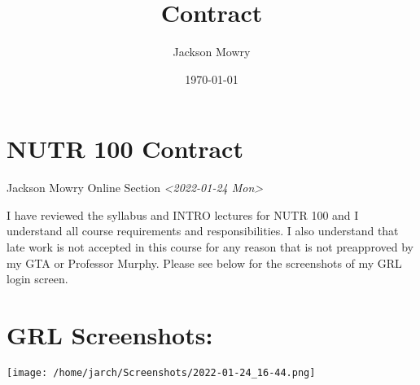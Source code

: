 \documentclass[11pt]{article}
\author{Jackson Mowry}
\date{\today}
\title{Contract}
\begin{document}
\maketitle
\tableofcontents

\section{NUTR 100 Contract}
\label{sec:orgdfe4a4f}
Jackson Mowry
Online Section
\textit{<2022-01-24 Mon>}

I have reviewed the syllabus and INTRO lectures for NUTR 100 and I understand all course 
requirements and responsibilities. I also understand that late work is not accepted in this course 
for any reason that is not preapproved by my GTA or Professor Murphy. Please see below for the 
screenshots of my GRL login screen.

\section{GRL Screenshots:}
\label{sec:orgbcd1010}
\begin{center}
\texttt{[image: /home/jarch/Screenshots/2022-01-24\_16-44.png]}
\end{center}
\end{document}
